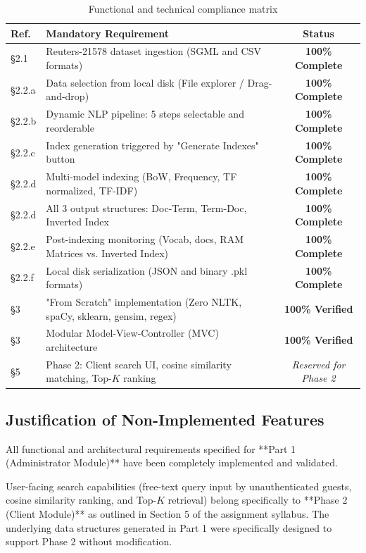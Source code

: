 \documentclass[11pt,a4paper]{article}
\begin{document}
\begin{table}[htbp]
\centering
\small
\begin{tabular}{lp{8.5cm}c}
\toprule
\textbf{Ref.} & \textbf{Mandatory Requirement} & \textbf{Status} \\
\midrule
\S 2.1 & Reuters-21578 dataset ingestion (SGML and CSV formats) & \textbf{100\% Complete} \\
\S 2.2.a & Data selection from local disk (File explorer / Drag-and-drop) & \textbf{100\% Complete} \\
\S 2.2.b & Dynamic NLP pipeline: 5 steps selectable and reorderable & \textbf{100\% Complete} \\
\S 2.2.c & Index generation triggered by "Generate Indexes" button & \textbf{100\% Complete} \\
\S 2.2.d & Multi-model indexing (BoW, Frequency, TF normalized, TF-IDF) & \textbf{100\% Complete} \\
\S 2.2.d & All 3 output structures: Doc-Term, Term-Doc, Inverted Index & \textbf{100\% Complete} \\
\S 2.2.e & Post-indexing monitoring (Vocab, docs, RAM Matrices vs. Inverted Index) & \textbf{100\% Complete} \\
\S 2.2.f & Local disk serialization (JSON and binary .pkl formats) & \textbf{100\% Complete} \\
\S 3 & "From Scratch" implementation (Zero NLTK, spaCy, sklearn, gensim, regex) & \textbf{100\% Verified} \\
\S 3 & Modular Model-View-Controller (MVC) architecture & \textbf{100\% Verified} \\
\midrule
\S 5 & Phase 2: Client search UI, cosine similarity matching, Top-$K$ ranking & \textit{Reserved for Phase 2} \\
\bottomrule
\end{tabular}
\caption{Functional and technical compliance matrix}
\label{tab:compliance}
\end{table}

\subsection{Justification of Non-Implemented Features}
All functional and architectural requirements specified for **Part 1 (Administrator Module)** have been completely implemented and validated.

User-facing search capabilities (free-text query input by unauthenticated guests, cosine similarity ranking, and Top-$K$ retrieval) belong specifically to **Phase 2 (Client Module)** as outlined in Section 5 of the assignment syllabus. The underlying data structures generated in Part 1 were specifically designed to support Phase 2 without modification.
\end{document}
